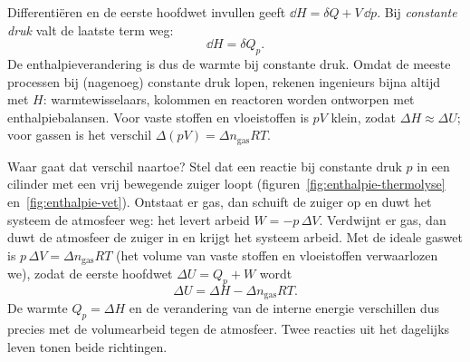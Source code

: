 Differenti\"eren en de eerste hoofdwet invullen geeft $\dd H = \delta Q + V\,\dd p$. Bij \emph{constante druk} valt de laatste term weg:
\begin{equation}
\dd H = \delta Q_p .
\end{equation}
De enthalpieverandering is dus de warmte bij constante druk. Omdat de meeste processen bij (nagenoeg) constante druk lopen, rekenen ingenieurs bijna altijd met $H$: warmtewisselaars, kolommen en reactoren worden ontworpen met enthalpiebalansen. Voor vaste stoffen en vloeistoffen is $pV$ klein, zodat $\Delta H \approx \Delta U$; voor gassen is het verschil $\Delta(pV) = \Delta n_\text{gas}RT$.

Waar gaat dat verschil naartoe? Stel dat een reactie bij constante druk $p$ in een cilinder met een vrij bewegende zuiger loopt (figuren~\ref{fig:enthalpie-thermolyse} en~\ref{fig:enthalpie-vet}). Ontstaat er gas, dan schuift de zuiger op en duwt het systeem de atmosfeer weg: het levert arbeid $W = -p\,\Delta V$. Verdwijnt er gas, dan duwt de atmosfeer de zuiger in en krijgt het systeem arbeid. Met de ideale gaswet is $p\,\Delta V = \Delta n_\text{gas}RT$ (het volume van vaste stoffen en vloeistoffen verwaarlozen we), zodat de eerste hoofdwet $\Delta U = Q_p + W$ wordt
\begin{equation}
\Delta U = \Delta H - \Delta n_\text{gas}RT .
\label{eq:dU-dH}
\end{equation}
De warmte $Q_p = \Delta H$ en de verandering van de interne energie verschillen dus precies met de volumearbeid tegen de atmosfeer. Twee reacties uit het dagelijks leven tonen beide richtingen.

